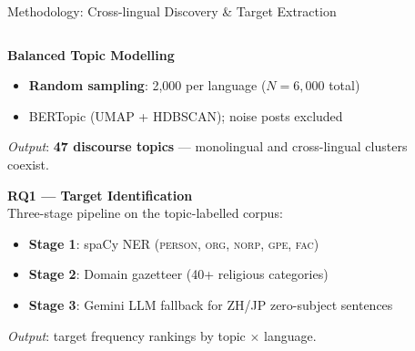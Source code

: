 \documentclass[aspectratio=169,10pt]{beamer}
\newcommand{\keyword}[1]{\textcolor{uzhblue}{\textbf{#1}}}
\begin{document}
\begin{frame}{Methodology: Cross-lingual Discovery \& Target Extraction}
  \begin{columns}[T,onlytextwidth]
    \begin{column}{0.56\textwidth}
      \small
      \textbf{Balanced Topic Modelling}\\
      \begin{itemize}
        \item \keyword{Random sampling}: 2,000 per language
              ($N=6{,}000$ total)
        \item BERTopic (UMAP + HDBSCAN); noise posts excluded
      \end{itemize}
      \textit{Output}: \keyword{47 discourse topics} — monolingual
      and cross-lingual clusters coexist.

      \vspace{0.6em}
      \textbf{RQ1 — Target Identification}\\
      Three-stage pipeline on the topic-labelled corpus:
      \begin{itemize}
        \item \textbf{Stage 1}: spaCy NER
              (\textsc{person, org, norp, gpe, fac})
        \item \textbf{Stage 2}: Domain gazetteer
              (40+ religious categories)
        \item \textbf{Stage 3}: Gemini LLM fallback for ZH/JP
              zero-subject sentences
      \end{itemize}
      \textit{Output}: target frequency rankings by topic $\times$
      language.
    \end{column}

    \begin{column}{0.40\textwidth}
      \centering\footnotesize
      \vspace{0.4em}
      \begin{tikzpicture}[
          node distance=0.55cm,
          box/.style={draw, rounded corners, text width=3.2cm,
                      align=center, minimum height=0.85cm,
                      font=\footnotesize},
          sep/.style={draw=none, text width=3.2cm, align=center,
                      font=\scriptsize\itshape, text=mutedgray}
        ]


\end{tikzpicture}
\end{column}
\end{columns}
\end{frame}
\end{document}
